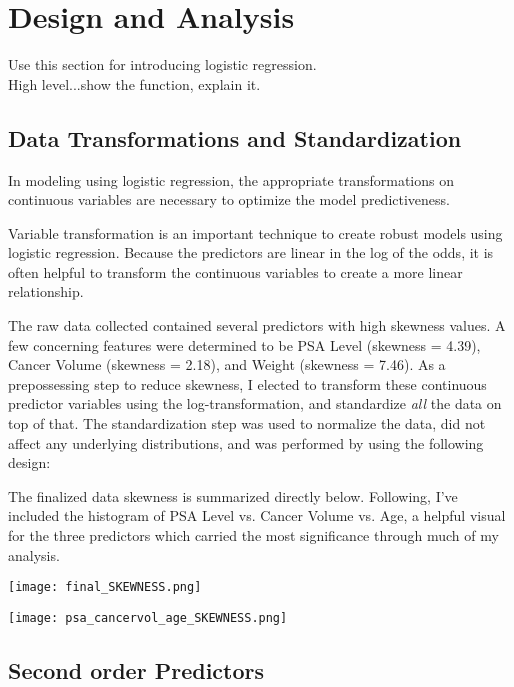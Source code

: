 
\section{Design and Analysis}

Use this section for introducing logistic regression. \\
High level...show the function, explain it.

\subsection{Data Transformations and Standardization}

In modeling using logistic regression, the appropriate transformations on continuous variables are necessary to optimize the model predictiveness. \par
Variable transformation is an important technique to create robust models using logistic regression. Because the predictors are linear in the log of the odds, it is often helpful to transform the continuous variables to create a more linear relationship. \par
The raw data collected contained several predictors with high skewness values.
A few concerning features were determined to be PSA Level (skewness = 4.39), Cancer Volume (skewness = 2.18), and Weight (skewness = 7.46). As a prepossessing step to reduce skewness, I elected to transform these continuous predictor variables using the log-transformation, and standardize \textit{all} the data on top of that. The standardization step was used to normalize the data, did not affect any underlying distributions, and was performed by using the following design: \par 

The finalized data skewness is summarized directly below. Following, I've included the histogram of PSA Level vs. Cancer Volume vs. Age, a helpful visual for the three predictors which carried the most significance through much of my analysis.

\begin{center}
	\texttt{[image: final\_SKEWNESS.png]} \\
\end{center}

\begin{center}
	\texttt{[image: psa\_cancervol\_age\_SKEWNESS.png]}
\end{center}

\subsection{Second order Predictors}

